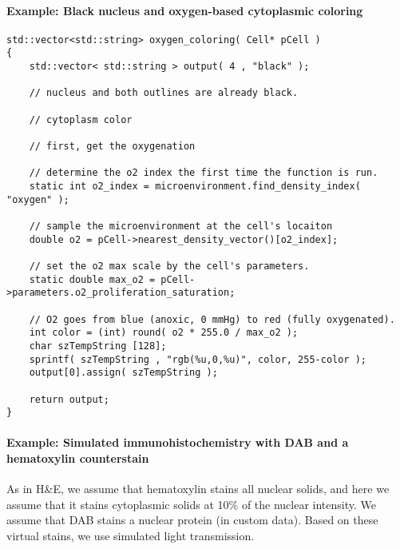 \documentclass[12pt]{article}
\begin{document}
\paragraph{Example: Black nucleus and oxygen-based cytoplasmic coloring}  
\begin{verbatim}
std::vector<std::string> oxygen_coloring( Cell* pCell )
{
    std::vector< std::string > output( 4 , "black" ); 
	
    // nucleus and both outlines are already black. 

    // cytoplasm color 

    // first, get the oxygenation 
	
    // determine the o2 index the first time the function is run. 
    static int o2_index = microenvironment.find_density_index( "oxygen" ); 

    // sample the microenvironment at the cell's locaiton 
    double o2 = pCell->nearest_density_vector()[o2_index]; 

    // set the o2 max scale by the cell's parameters. 
    static double max_o2 = pCell->parameters.o2_proliferation_saturation;  

    // O2 goes from blue (anoxic, 0 mmHg) to red (fully oxygenated). 
    int color = (int) round( o2 * 255.0 / max_o2 ); 
    char szTempString [128]; 
    sprintf( szTempString , "rgb(%u,0,%u)", color, 255-color ); 
    output[0].assign( szTempString ); 

    return output; 
}
\end{verbatim}

\paragraph{Example: Simulated immunohistochemistry with 
DAB and a hematoxylin counterstain} 
As in H\&E, we 
assume that hematoxylin stains all nuclear solids, and here 
we assume that it stains cytoplasmic solids at 10\% of the 
nuclear intensity. 
We assume that DAB stains a nuclear protein (in custom data). Based 
on these virtual stains, we use simulated light transmission. 
\end{document}
